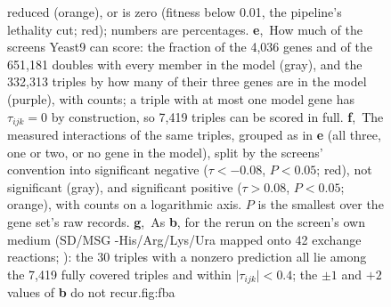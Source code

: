 \begin{figure}[t]
{reduced (orange), or is zero (fitness below 0.01, the pipeline's lethality cut; red); numbers
are percentages. \textbf{e},~How much of the screens Yeast9 can score: the fraction of the
4,036 genes and of the 651,181 doubles with every member in the model (gray), and the
332,313 triples by how many of their three genes are in the model (purple), with counts; a
triple with at most one model gene has $\tau_{ijk}=0$ by construction, so 7,419 triples can
be scored in full. \textbf{f},~The measured interactions of the same triples, grouped as in
\textbf{e} (all three, one or two, or no gene in the model), split by the screens' convention
into significant negative ($\tau<-0.08$, $P<0.05$; red), not significant (gray), and
significant positive ($\tau>0.08$, $P<0.05$; orange), with counts on a logarithmic axis. $P$
is the smallest over the gene set's raw records. \textbf{g},~As \textbf{b}, for the rerun on
the screen's own medium (SD/MSG -His/Arg/Lys/Ura mapped onto 42 exchange reactions;
): the 30 triples with a nonzero prediction all lie among the
7,419 fully covered triples and within $\lvert\tau_{ijk}\rvert<0.4$; the $\pm 1$ and $+2$
values of \textbf{b} do not recur.}{fig:fba}
\end{figure}



